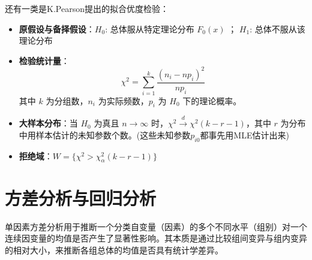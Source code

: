 \documentclass[a4paper]{ctexart}
\begin{document}
还有一类是K.Pearson提出的拟合优度检验：
\begin{itemize}
    \item \textbf{原假设与备择假设}：$H_0$: 总体服从特定理论分布 $F_0(x)$ ； $H_1$: 总体不服从该理论分布
    \item \textbf{检验统计量}：
    \[ \chi^2 = \sum_{i=1}^k \frac{(n_i - np_i)^2}{np_i} \]
    其中 $k$ 为分组数，$n_i$ 为实际频数，$p_i$ 为 $H_0$ 下的理论概率。
    \item \textbf{大样本分布}：当 $H_0$ 为真且 $n \to \infty$ 时，$\chi^2 \xrightarrow{d} \chi^2(k - r - 1)$，其中 $r$ 为分布中用样本估计的未知参数个数。(这些未知参数$p_{i0}$都事先用MLE估计出来)
    \item \textbf{拒绝域}：$W = \{ \chi^2 > \chi^2_{\alpha}(k - r - 1) \}$
\end{itemize}

\newpage

\section{方差分析与回归分析}

单因素方差分析用于推断一个分类自变量（因素）的多个不同水平（组别）对一个连续因变量的均值是否产生了显著性影响。其本质是通过比较组间变异与组内变异的相对大小，来推断各组总体的均值是否具有统计学差异。
\end{document}
